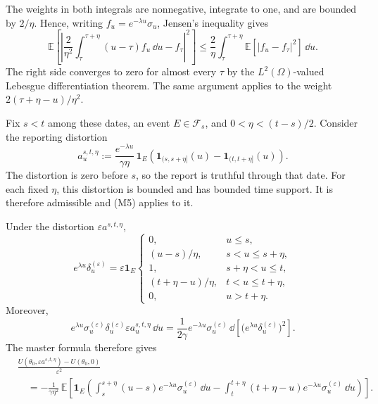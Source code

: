 \documentclass[12pt]{article}
\newcommand{\E}{\mathbb{E}}
\begin{document}
The weights in both integrals are nonnegative, integrate to one, and are bounded by
\(2/\eta\). Hence, writing \(f_u=e^{-\lambda u}\sigma_u\), Jensen's
inequality gives
\[
  \mathbb E\left[
    \left|
      \frac{2}{\eta^2}\int_\tau^{\tau+\eta}
        (u-\tau)f_u\,\dd{u}-f_\tau
    \right|^2
  \right]
  \leq
  \frac{2}{\eta}\int_\tau^{\tau+\eta}
    \mathbb E\left[|f_u-f_\tau|^2\right]\,\dd{u}.
\]
The right side converges to zero for almost every \(\tau\) by the
\(L^2(\Omega)\)-valued Lebesgue differentiation theorem. The same
argument applies to the weight
\(2(\tau+\eta-u)/\eta^2\).

Fix \(s<t\) among these dates, an event \(E\in\mathcal F_s\), and
\(0<\eta<(t-s)/2\). Consider the reporting distortion
\begin{equation}\label{eq:ou-two-adjustments}
  a_u^{s,t,\eta}
  :=
  \frac{e^{-\lambda u}}{\gamma\eta}\,\mathbf 1_E
  \left(
    \mathbf 1_{(s,s+\eta]}(u)
    -
    \mathbf 1_{(t,t+\eta]}(u)
  \right).
\end{equation}
The distortion is zero before \(s\), so the report is truthful through
that date. For each
fixed \(\eta\), this distortion is bounded and has bounded time support.
It is therefore admissible and
\textnormal{(M5)} applies to it.

Under the distortion \(\varepsilon a^{s,t,\eta}\),
\[
e^{\lambda u}\delta_u^{(\varepsilon)}
=
\varepsilon\mathbf 1_E
\begin{cases}
  0, & u\leq s,\\[2pt]
  (u-s)/\eta, & s<u\leq s+\eta,\\[2pt]
  1, & s+\eta<u\leq t,\\[2pt]
  (t+\eta-u)/\eta, & t<u\leq t+\eta,\\[2pt]
  0, & u>t+\eta.
\end{cases}
\]
Moreover,
\[
  e^{\lambda u}\sigma_u^{(\varepsilon)}
  \delta_u^{(\varepsilon)}
  \varepsilon a_u^{s,t,\eta}\,\dd u
  =
  \frac{1}{2\gamma}
  e^{-\lambda u}\sigma_u^{(\varepsilon)}
  \,\dd\!\left[
    \bigl(e^{\lambda u}\delta_u^{(\varepsilon)}\bigr)^2
  \right].
\]
The master formula therefore gives
\begin{align}
&\frac{
  U(\theta_0,\varepsilon a^{s,t,\eta})-U(\theta_0,0)
}{\varepsilon^2}
\nonumber\\
&\quad
=-\frac{1}{\gamma\eta^2}\,
\E\!\left[
\mathbf 1_E\left(
  \int_s^{s+\eta}
    (u-s)e^{-\lambda u}\sigma_u^{(\varepsilon)}\,\dd u
  -
  \int_t^{t+\eta}
    (t+\eta-u)e^{-\lambda u}\sigma_u^{(\varepsilon)}\,\dd u
\right)\right].
\label{eq:ou-two-adjustment-gain}
\end{align}
\end{document}
